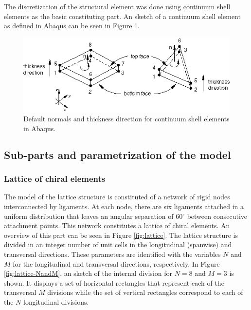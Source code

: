   The discretization of the structural element was done using continuum shell elements as the basic constituting part. An sketch of a continuum shell element as defined in Abaqus can be seen in Figure \ref{fig:shellElement}.

  \begin{figure}[!htpb]
    \centering
    \includegraphics[width=0.8 \textwidth]{figures/model/eshell-scon-normal-nls}
    \caption[Default normals and thickness direction for continuum shell elements in Abaqus]{Default normals and thickness direction for continuum shell elements in Abaqus. \cite{Abaqus}}\label{fig:shellElement}
  \end{figure}

  \subsection{Sub-parts and parametrization of the model} \label{subsec:parametrization_Model}

    \subsubsection{Lattice of chiral elements} \label{subsubsec:lattice_Parametrization}

    The model of the lattice structure is constituted of a network of rigid nodes interconnected by ligaments. At each node, there are six ligaments attached in a uniform distribution that leaves an angular separation of 60$^{\circ}$ between consecutive attachment points. This network constitutes a lattice of chiral elements. An overview of this part can be seen in Figure \ref{fig:lattice}. The lattice structure is divided in an integer number of unit cells in the longitudinal (spanwise) and transversal directions. These parameters are identified with the variables $N$ and $M$ for the longitudinal and transversal directions, respectively. In Figure \ref{fig:lattice-NandM}, an sketch of the internal division for $N = 8$ and $M = 3$ is shown. It displays a set of horizontal rectangles that represent each of the transversal $M$ divisions while the set of vertical rectangles correspond to each of the $N$ longitudinal divisions.

